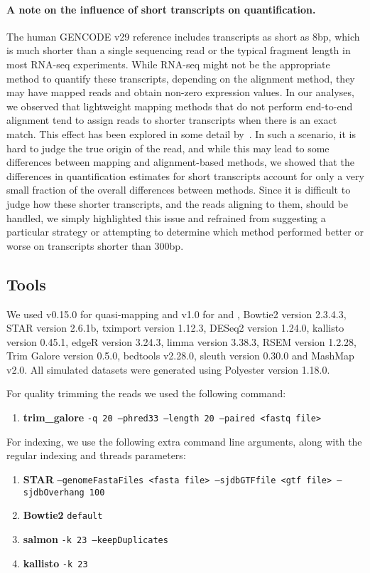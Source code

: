 \paragraph{A note on the influence of short transcripts on quantification.} 
The human GENCODE v29 reference includes transcripts as short as 8bp, which is
much shorter than a single sequencing read or the typical fragment length in
most RNA-seq experiments. While RNA-seq might not be the appropriate method to
quantify these transcripts, depending on the alignment method, they may have
mapped reads and obtain non-zero expression values. In our analyses, we observed
that lightweight mapping methods that do not perform end-to-end alignment tend
to assign reads to shorter transcripts when there is an exact match. This effect
has been explored in some detail by~\citet{wu2018limitations}. In such a
scenario, it is hard to judge the true origin of the read, and while this may
lead to some differences between mapping and alignment-based methods, we showed that the
differences in quantification estimates for short transcripts account for only a
very small fraction of the overall differences between methods. 
Since it is difficult to judge how these shorter transcripts, and the
reads aligning to them, should be handled, we simply highlighted this issue and
refrained from suggesting a particular strategy or attempting to determine which
method performed better or worse on transcripts shorter than $300$bp. 

\subsection{Tools}
\label{subsec:commands}
We used \salmon v0.15.0 for quasi-mapping and \salmon v1.0 for \hsa and \saf, Bowtie2 version 2.3.4.3, STAR version 2.6.1b, tximport
version 1.12.3, DESeq2 version 1.24.0, kallisto version 0.45.1, edgeR version 3.24.3, limma version 3.38.3, 
RSEM version 1.2.28, Trim Galore version 0.5.0, bedtools v2.28.0, sleuth version 0.30.0 and
MashMap v2.0. All simulated datasets were generated using Polyester version 1.18.0.

For quality trimming the reads we used the following command:
\raggedright
\begin{enumerate}
\item \textbf{trim\_galore} \texttt{-q 20 --phred33 --length 20 --paired <fastq file>}
\end{enumerate}

For indexing, we use the following extra command line arguments, along with the regular
indexing and threads parameters:
\begin{enumerate}
\item \textbf{STAR} \texttt{--genomeFastaFiles <fasta file> --sjdbGTFfile <gtf file> --sjdbOverhang 100}
\item \textbf{Bowtie2} \texttt{default}
\item \textbf{salmon} \texttt{-k 23 --keepDuplicates}
\item \textbf{kallisto} \texttt{-k 23}
\end{enumerate}

